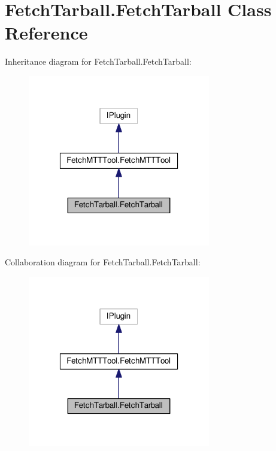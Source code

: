 \hypertarget{class_fetch_tarball_1_1_fetch_tarball}{\section{Fetch\-Tarball.\-Fetch\-Tarball Class Reference}
\label{class_fetch_tarball_1_1_fetch_tarball}
}


Inheritance diagram for Fetch\-Tarball.\-Fetch\-Tarball\-:
\nopagebreak
\begin{figure}[H]
\begin{center}
\leavevmode
\includegraphics[width=226pt]{class_fetch_tarball_1_1_fetch_tarball__inherit__graph}
\end{center}
\end{figure}


Collaboration diagram for Fetch\-Tarball.\-Fetch\-Tarball\-:
\nopagebreak
\begin{figure}[H]
\begin{center}
\leavevmode
\includegraphics[width=226pt]{class_fetch_tarball_1_1_fetch_tarball__coll__graph}
\end{center}
\end{figure}
